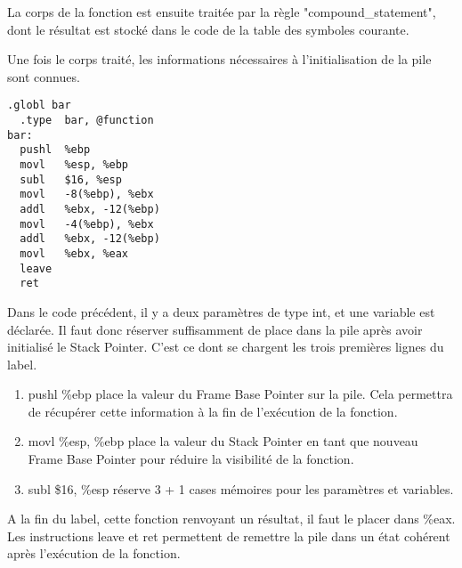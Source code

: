 La corps de la fonction est ensuite traitée par la règle "compound\_statement", dont le résultat est stocké dans le code de la table des symboles courante.

Une fois le corps traité, les informations nécessaires à l'initialisation de la pile sont connues. 

\begin{verbatim}
.globl bar               
  .type  bar, @function     
bar:        
  pushl  %ebp     
  movl   %esp, %ebp     
  subl   $16, %esp     
  movl   -8(%ebp), %ebx     
  addl   %ebx, -12(%ebp)    
  movl   -4(%ebp), %ebx     
  addl   %ebx, -12(%ebp)    
  movl   %ebx, %eax     
  leave      
  ret
\end{verbatim}

Dans le code précédent, il y a deux paramètres de type int, et une variable est déclarée. Il faut donc réserver suffisamment de place dans la pile après avoir initialisé le Stack Pointer. C'est ce dont se chargent les trois premières lignes du label.
\begin{enumerate}
\item  pushl  \%ebp place la valeur du Frame Base Pointer sur la pile. Cela permettra de récupérer cette information à la fin de l'exécution de la fonction.
\item  movl   \%esp, \%ebp place la valeur du Stack Pointer en tant que nouveau Frame Base Pointer pour réduire la visibilité de la fonction.
\item  subl   \$16, \%esp réserve 3 + 1 cases mémoires pour les paramètres et variables.
\end{enumerate}

A la fin du label, cette fonction renvoyant un résultat, il faut le placer dans \%eax. Les instructions leave et ret permettent de remettre la pile dans un état cohérent après l'exécution de la fonction.